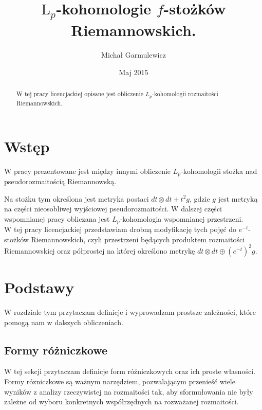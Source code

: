 \documentclass[licencjacka]{pracamgr}
\author{Michał Garmulewicz}
\title{$\mathrm{L}_p$-kohomologie $f$-stożków Riemannowskich.}
\date{Maj 2015}
\theoremstyle{definition}
\theoremstyle{definition}
\theoremstyle{plain}
\theoremstyle{plain}
\begin{document}
\maketitle

\begin{abstract}
  W tej pracy licencjackiej opisane jest obliczenie $L_p$-kohomologii
  rozmaitości Riemannowskich.
\end{abstract}

\tableofcontents

\chapter{Wstęp}

W pracy \cite{weber} prezentowane jest między innymi obliczenie
$L_p$-kohomologii stożka nad pseudorozmaitością Riemannowską. 

Na stożku tym określona jest metryka postaci
$dt \otimes dt + t^2 g$, gdzie $g$ 
jest metryką na części nieosobliwej wyjściowej pseudorozmaitości.
W dalszej części wspomnianej pracy obliczana jest $L_p$-kohomologia
wspomnianej przestrzeni.
\\


W tej pracy licencjackiej przedstawiam drobną modyfikację tych pojęć do
$e^{-t}$-stożków Riemannowskich, czyli przestrzeni będących produktem
rozmaitości Riemannowskiej oraz półprostej na której określono metrykę
$dt \otimes dt \oplus (e^{-t})^2 g$. \\


\chapter{Podstawy}
W rozdziale tym przytaczam definicje i wyprowadzam prostsze zależności, które
pomogą nam w dalszych obliczeniach. \\


\section{Formy różniczkowe}
W tej sekcji przytaczam definicje form róźniczkowych oraz ich proste
własności. Formy rózniczkowe są ważnym narzędziem, pozwalającym
przenieść wiele wyników z analizy rzeczywistej na rozmaitości tak, aby
sformułowania nie były zależne od wyboru konkretnych współrzędnych na rozważanej
rozmaitości. \\
\end{document}

